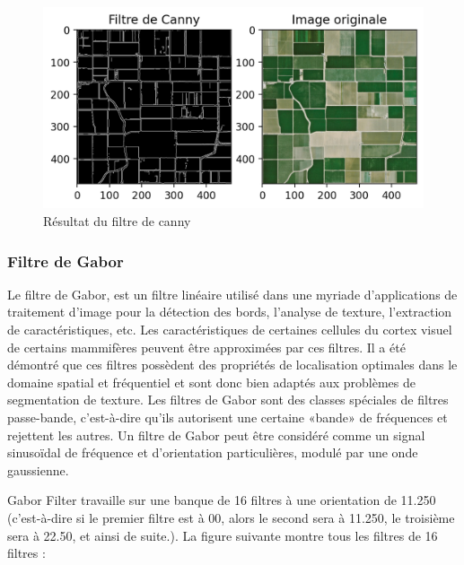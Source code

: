 \documentclass[12pt, openany]{report}
\begin{document}
\begin{figure}[H]
\centering
\includegraphics[scale=1.2]{canny_filter.png}
\caption{Résultat du filtre de canny}
\end{figure}



\subsubsection{Filtre de Gabor}

Le filtre de Gabor, est un filtre linéaire utilisé dans une myriade d'applications de traitement d'image pour la détection des bords, l'analyse de texture, l'extraction de caractéristiques, etc. Les caractéristiques de certaines cellules du cortex visuel de certains mammifères peuvent être approximées par ces filtres. Il a été démontré que ces filtres possèdent des propriétés de localisation optimales dans le domaine spatial et fréquentiel et sont donc bien adaptés aux problèmes de segmentation de texture. Les filtres de Gabor sont des classes spéciales de filtres passe-bande, c'est-à-dire qu'ils autorisent une certaine «bande» de fréquences et rejettent les autres. Un filtre de Gabor peut être considéré comme un signal sinusoïdal de fréquence et d'orientation particulières, modulé par une onde gaussienne.

Gabor Filter travaille sur une banque de 16 filtres à une orientation de 11.250 (c'est-à-dire si le premier filtre est à 00, alors le second sera à 11.250, le troisième sera à 22.50, et ainsi de suite.). La figure suivante montre tous les filtres de 16 filtres :
\end{document}
